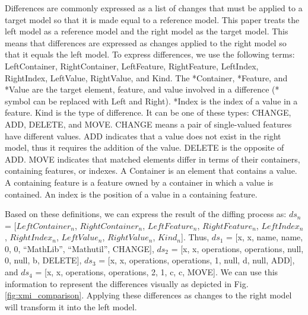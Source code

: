 \documentclass{jot}
\newcommand{\dk}[1]{\textcolor{blue}{\textbf{[Dimitris: #1]}}}
\begin{document}
    Differences are commonly expressed as a list of changes that must be applied to a target model so that it is made equal to a reference model.
    This paper treats the left model as a reference model and the right model as the target model.
    This means that differences are expressed as changes applied to the right model so that it equals the left model.
    To express differences, we use the following terms: \textsf{LeftContainer}, \textsf{RightContainer}, \textsf{LeftFeature}, \textsf{RightFeature}, \textsf{LeftIndex}, \textsf{RightIndex}, \textsf{LeftValue}, \textsf{RightValue}, and \textsf{Kind}. The \textsf{*Container}, \textsf{*Feature}, and \textsf{*Value} are the target element, feature, and value involved in a difference (\textsf{*} symbol can be replaced with \textsf{Left} and \textsf{Right}). \textsf{*Index} is the index of a value in a feature. \textsf{Kind} is the type of difference. It can be one of these types: \textsf{CHANGE}, \textsf{ADD}, \textsf{DELETE}, and \textsf{MOVE}. \textsf{CHANGE} means a pair of single-valued features 
    have different values. \textsf{ADD} indicates that a value does not exist in the right model, thus it requires the addition of the value. \textsf{DELETE} is the opposite
    of \textsf{ADD}. \textsf{MOVE} indicates that matched elements differ in terms of their containers, containing features, or indexes.
    A Container is an element that contains a value. A containing feature is a feature owned by a container in which a value is contained. An index is the position of a value in a containing feature.
    
    Based on these definitions, we can express the result of the diffing process as: $ds_{n}$ = [$LeftContainer_n$, $RightContainer_n$, $LeftFeature_n$, $RightFeature_n$, $LeftIndex_n$, $RightIndex_n$, $LeftValue_n$, $RightValue_n$, $Kind_n$]. Thus, $ds_{1}$ =  [\textsf{x}, \textsf{x}, \textsf{name}, \textsf{name}, 0, 0, ``MathLib'', ``Mathutil'', \textsf{CHANGE}], $ds_{2}$ = [\textsf{x}, \textsf{x}, \textsf{operations}, \textsf{operations}, null, 0, null, \textsf{b}, \textsf{DELETE}], $ds_{3}$ = [\textsf{x}, \textsf{x}, \textsf{operations}, \textsf{operations}, 1, null, \textsf{d}, null, \textsf{ADD}], and $ds_{4}$ = [\textsf{x}, \textsf{x}, \textsf{operations}, \textsf{operations}, 2, 1, \textsf{c}, \textsf{c}, \textsf{MOVE}]. We can use this information to represent the differences visually as depicted in Fig. \ref{fig:xmi_comparison}. Applying these differences as changes to the right model will transform it into the left model.  
    
\end{document}
